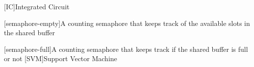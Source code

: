[IC]{Integrated Circuit}

[semaphore-empty]{A counting semaphore that keeps track of the available slots in the shared buffer}

[semaphore-full]{A counting semaphore that keeps track if the shared buffer is full or not}
[SVM]{Support Vector Machine}
